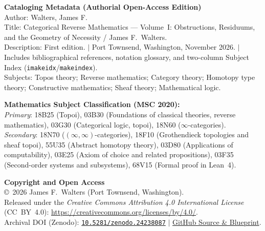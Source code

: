\documentclass[10pt,twoside,openright]{book}
\theoremstyle{crmplain}
\theoremstyle{crmdef}
\theoremstyle{crmremark}
\begin{document}
\vspace{0.18em}
\noindent\textbf{Cataloging Metadata (Authorial Open-Access Edition)}\\
Author: Walters, James F.\\
Title: Categorical Reverse Mathematics --- Volume~I: Obstructions, Residuums, and the Geometry of Necessity / James F.\ Walters.\\
Description: First edition. $|$ Port Townsend, Washington, November 2026. $|$ Includes bibliographical references, notation glossary, and two-column Subject Index (\texttt{imakeidx}/\texttt{makeindex}).\\
Subjects: Topos theory; Reverse mathematics; Category theory; Homotopy type theory; Constructive mathematics; Sheaf theory; Mathematical logic.

\vspace{0.18em}
\noindent\textbf{Mathematics Subject Classification (MSC 2020):}\\
\emph{Primary}: 18B25 (Topoi), 03B30 (Foundations of classical theories, reverse mathematics), 03G30 (Categorical logic, topoi), 18N60 ($\infty$-categories).\\
\emph{Secondary}: 18N70 ($(\infty,\infty)$-categories), 18F10 (Grothendieck topologies and sheaf topoi), 55U35 (Abstract homotopy theory), 03D80 (Applications of computability), 03E25 (Axiom of choice and related propositions), 03F35 (Second-order systems and subsystems), 68V15 (Formal proof in Lean~4).

\vspace{0.12em}
\noindent\textbf{Copyright and Open Access}\\
\copyright\ 2026 James F.\ Walters (Port Townsend, Washington).\\
Released under the \emph{Creative Commons Attribution 4.0 International License} (CC~BY~4.0): \url{https://creativecommons.org/licenses/by/4.0/}.\\
Archival DOI (Zenodo): \href{https://doi.org/10.5281/zenodo.24238087}{\texttt{10.5281/zenodo.24238087}} $|$ \href{https://github.com/tryggth/categorical-reverse-mathematics}{GitHub Source \& Blueprint}.
\end{document}
